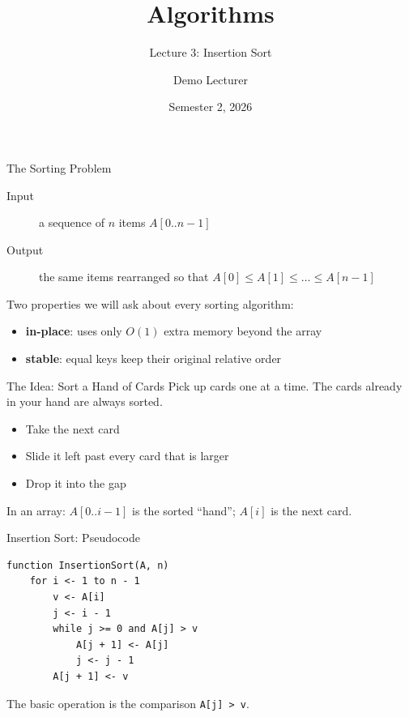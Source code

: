 \documentclass[aspectratio=169,11pt]{beamer}
\title{Algorithms}
\subtitle{Lecture 3: Insertion Sort}
\author{Demo Lecturer}
\date{Semester 2, 2026}
\begin{document}
\begin{frame}
  \titlepage
\end{frame}
\setcounter{framenumber}{2}

\begin{frame}{The Sorting Problem}
  \begin{description}
    \item[Input] a sequence of $n$ items $A[0..n-1]$
    \item[Output] the same items rearranged so that $A[0] \le A[1] \le \dots \le A[n-1]$
  \end{description}
  \bigskip
  Two properties we will ask about every sorting algorithm:
  \begin{itemize}
    \item \textbf{in-place}: uses only $O(1)$ extra memory beyond the array
    \item \textbf{stable}: equal keys keep their original relative order
  \end{itemize}
\end{frame}

\begin{frame}{The Idea: Sort a Hand of Cards}
  Pick up cards one at a time. The cards already in your hand are always sorted.
  \medskip
  \begin{itemize}
    \item Take the next card
    \item Slide it left past every card that is larger
    \item Drop it into the gap
  \end{itemize}
  \bigskip
  In an array: $A[0..i-1]$ is the sorted ``hand''; $A[i]$ is the next card.
\end{frame}

\begin{frame}[fragile]{Insertion Sort: Pseudocode}
\begin{verbatim}
function InsertionSort(A, n)
    for i <- 1 to n - 1
        v <- A[i]
        j <- i - 1
        while j >= 0 and A[j] > v
            A[j + 1] <- A[j]
            j <- j - 1
        A[j + 1] <- v
\end{verbatim}
  \small The basic operation is the comparison \verb|A[j] > v|.
\end{frame}
\end{document}

